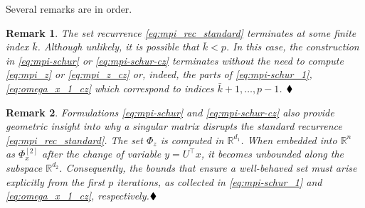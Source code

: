\documentclass[journal,twoside,web]{ieeecolor}
\newtheorem{rem}{Remark}
\newcommand{\eor}{\ensuremath{\hfill\blacklozenge}}
\newtheorem{rem}{Remark}
\newcommand{\eor}{\hfill\ensuremath{\blacklozenge}}
\begin{document}
\noindent Several remarks are in order. 
\begin{rem}
The set recurrence \eqref{eq:mpi_rec_standard} terminates at some finite index $\bar k$. Although unlikely, it is possible that $\bar k < p$. In this case, the construction in \eqref{eq:mpi-schur} or \eqref{eq:mpi-schur-cz} terminates without the need to compute \eqref{eq:mpi_z} or \eqref{eq:mpi_z_cz} or, indeed, the parts of \eqref{eq:mpi-schur_1}, \eqref{eq:omega_x_1_cz} which correspond to indices $\bar k+1, \ldots, p-1$. \eor
\end{rem}
\begin{rem}
Formulations \eqref{eq:mpi-schur} and \eqref{eq:mpi-schur-cz} also provide geometric insight into why a singular matrix disrupts the standard recurrence \eqref{eq:mpi_rec_standard}. The set $\Phi_z$ is computed in $\mathbb{R}^{d_1}$. When embedded into $\mathbb{R}^n$ as $\Phi_x^{[2]}$ after the change of variable $y=U^\top x$, it becomes unbounded along the subspace $\mathbb{R}^{d_2}$. Consequently, the bounds that ensure a well-behaved set must arise explicitly from the first $p$ iterations, as collected in \eqref{eq:mpi-schur_1} and \eqref{eq:omega_x_1_cz}, respectively.\eor
\end{rem}

\end{document}
